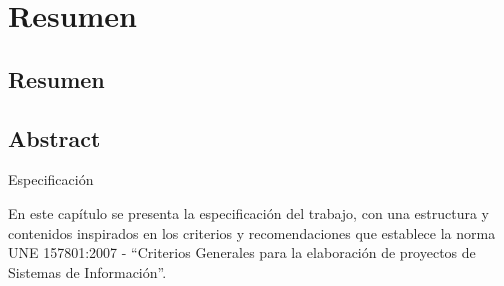 \chapter{Resumen}
\section{Resumen}
\section{Abstract}

{Especificación}

En este capítulo se presenta la especificación del trabajo, con una estructura y
contenidos inspirados en los criterios y recomendaciones que establece la norma
UNE 157801:2007 - “Criterios Generales para la elaboración de proyectos de
Sistemas de Información”.